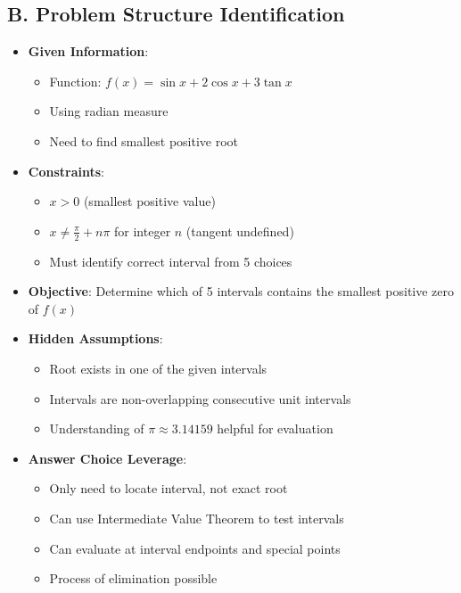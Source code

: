 \documentclass[]{article}
\begin{document}
\begin{problemconfigbox}
\subsection*{B. Problem Structure Identification}
\begin{itemize}[leftmargin=*]
    \item \textbf{Given Information}: 
    \begin{itemize}
        \item Function: $f(x) = \sin{x} + 2\cos{x} + 3\tan{x}$
        \item Using radian measure
        \item Need to find smallest positive root
    \end{itemize}
    \item \textbf{Constraints}: 
    \begin{itemize}
        \item $x > 0$ (smallest positive value)
        \item $x \neq \frac{\pi}{2} + n\pi$ for integer $n$ (tangent undefined)
        \item Must identify correct interval from 5 choices
    \end{itemize}
    \item \textbf{Objective}: Determine which of 5 intervals contains the smallest positive zero of $f(x)$
    \item \textbf{Hidden Assumptions}: 
    \begin{itemize}
        \item Root exists in one of the given intervals
        \item Intervals are non-overlapping consecutive unit intervals
        \item Understanding of $\pi \approx 3.14159$ helpful for evaluation
    \end{itemize}
    \item \textbf{Answer Choice Leverage}: 
    \begin{itemize}
        \item Only need to locate interval, not exact root
        \item Can use Intermediate Value Theorem to test intervals
        \item Can evaluate at interval endpoints and special points
        \item Process of elimination possible
    \end{itemize}
\end{itemize}


\end{problemconfigbox}
\end{document}
